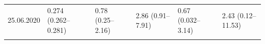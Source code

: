 \begin{tabular}{l|l|l|l|l|l}
\hline
\cellcolor{gray!6}{18.06.2020} & \cellcolor{gray!6}{0.268 (0.254–0.276)} & \cellcolor{gray!6}{0.71 (0.25–1.76)} & \cellcolor{gray!6}{2.67 (0.92– 6.57)} & \cellcolor{gray!6}{0.56 (0.031–2.26)} & \cellcolor{gray!6}{2.08 (0.11– 8.50)}\\
\hline
25.06.2020 & 0.274 (0.262–0.281) & 0.78 (0.25–2.16) & 2.86 (0.91– 7.91) & 0.67 (0.032–3.14) & 2.43 (0.12–11.53)\\
\hline
\cellcolor{gray!6}{02.07.2020} & \cellcolor{gray!6}{0.279 (0.268–0.285)} & \cellcolor{gray!6}{0.88 (0.25–2.73)} & \cellcolor{gray!6}{3.14 (0.91– 9.80)} & \cellcolor{gray!6}{0.83 (0.033–4.66)} & \cellcolor{gray!6}{2.97 (0.12–16.71)}\\
\hline
\end{tabular}